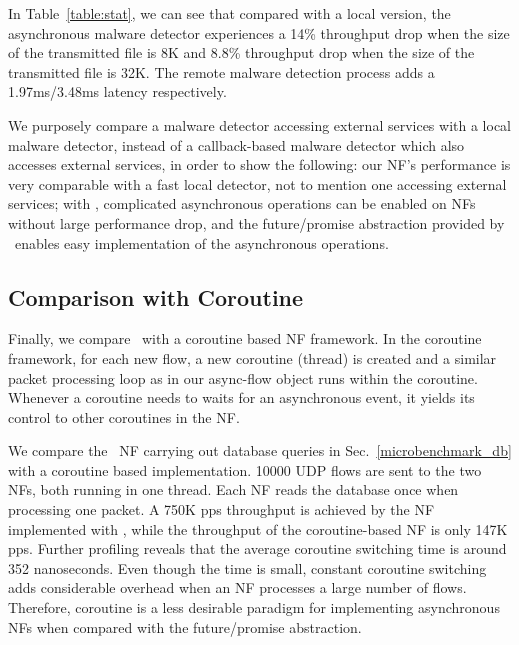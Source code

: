 In Table~\ref{table:stat}, %
 we can see that compared with a local version, the asynchronous malware detector experiences a 14\% throughput drop when the size of the transmitted file is 8K and 8.8\% throughput drop when the size of the transmitted file is 32K. The remote malware detection process adds a 1.97ms/3.48ms latency respectively. %

We purposely compare a malware detector accessing external services with a local malware detector, instead of a callback-based malware detector which also accesses external services, in order to show the following: our NF's performance is very comparable with a fast local detector, not to mention one accessing external services; with \netstar, complicated asynchronous operations can be enabled on NFs without large performance drop, and the future/promise abstraction provided by \netstar~enables easy implementation of the asynchronous operations.

\subsection{Comparison with Coroutine}
\label{sec:eval6}

Finally, we compare \netstar~with a coroutine based NF framework. %
In the coroutine framework, for each new flow, a new coroutine (thread) is created and a similar packet processing loop as in our async-flow object runs within the coroutine. Whenever a coroutine needs to waits for an asynchronous event, it yields its control to other coroutines in the NF. %

We compare the \netstar~NF carrying out database queries in Sec.~\ref{microbenchmark_db} with a coroutine based implementation. 10000 UDP flows are sent to the two NFs, both running in one thread. Each NF reads the database once when processing one packet. A 750K pps throughput is achieved by the NF implemented with \netstar, while the throughput of the coroutine-based NF is only 147K pps. Further profiling reveals that the average coroutine switching time is around 352 nanoseconds. Even though the time is small, constant coroutine switching adds considerable overhead when an NF processes a large number of flows. %
Therefore, coroutine is a less desirable paradigm for implementing asynchronous NFs when compared with the future/promise abstraction.
